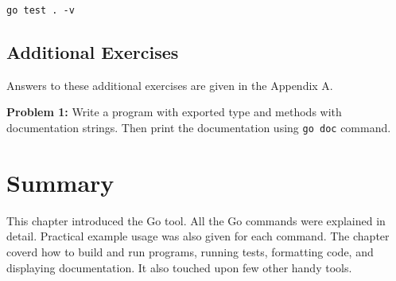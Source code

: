 \begin{lstlisting}[numbers=none]
go test . -v
\end{lstlisting}

\subsection{Additional Exercises}

Answers to these additional exercises are given in the Appendix A.

{\bfseries Problem 1:} Write a program with exported type and methods
with documentation strings.  Then print the documentation
using \texttt{go doc} command.

\section*{Summary}

This chapter introduced the Go tool.  All the Go commands were
explained in detail.  Practical example usage was also given for each
command.  The chapter coverd how to build and run programs, running
tests, formatting code, and displaying documentation.  It also touched
upon few other handy tools.
